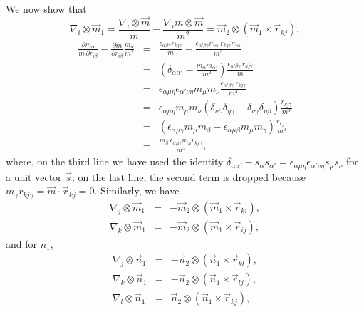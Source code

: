 \documentclass{article}
\begin{document}
We now show that
\begin{equation}
\nabla_i \otimes \vec m_1   
= \frac{ \nabla_i \otimes \vec m   } {m}
- \frac{ \nabla_i m \otimes \vec m } {m^2}   
= \vec m_2 \otimes (\vec m_1 \times \vec r_{kj}),
\label{eq:dim1}
\end{equation}
%
\begin{eqnarray*}
  \frac {\partial m_{\alpha}} {m \, \partial r_{i \beta} } 
  -
  \frac {\partial m} {\partial r_{i \beta}} 
  \frac {m_\alpha} {m^2} 
  &=&
  \frac{ \epsilon_{\alpha \beta \gamma} r_{kj \gamma} } { m }
  - \frac{ \epsilon_{\alpha' \beta \gamma} m_{\alpha'} r_{k j \gamma} m_\alpha }
    { m^3 } \\ 
  &=& 
  \left( 
       \delta_{\alpha \alpha'} 
       - \frac{ m_\alpha m_{\alpha'} }{ m^2 } 
  \right)  
  \frac{\epsilon_{\alpha' \beta \gamma} \, r_{kj \gamma} } {m} \\
  &=&
   \epsilon_{\alpha \mu \eta} \epsilon_{\alpha' \nu \eta}
   m_\mu m_\nu
  \frac{\epsilon_{\alpha' \beta \gamma} \, r_{kj \gamma} } {m^3} \\
  &=&
  \epsilon_{\alpha \mu \eta}   m_\mu m_\nu
  (\delta_{\nu \beta} \delta_{\eta \gamma} - 
   \delta_{\nu \gamma} \delta_{\eta \beta})
  \frac{ r_{kj \gamma} } {m^3} \\
  &=&
  (\epsilon_{\alpha \mu \gamma}   m_\mu m_\beta  - 
   \epsilon_{\alpha \mu \beta}   m_\mu m_\gamma )
  \frac{ r_{kj \gamma} } {m^3} \\
  &=&
  \frac{m_\beta \, \epsilon_{\alpha \mu \gamma}  m_\mu  r_{kj \gamma}} {m^3},
\end{eqnarray*}
%
where, on the third line we have used the identity 
$ \delta_{\alpha \alpha'} - s_\alpha s_{\alpha'} 
 = \epsilon_{\alpha \mu \eta} \epsilon_{\alpha' \nu \eta} s_\mu s_\nu $
for a unit vector $\vec s$; 
%
on the last line, the second term is dropped because 
$m_\gamma r_{kj \gamma}  = \vec m \cdot \vec r_{kj} = 0$.
%
Similarly, we have
\begin{eqnarray}
\nabla_j \otimes \vec m_1   &=&  -\vec m_2 \otimes (\vec m_1 \times \vec r_{ki}), \\
\nabla_k \otimes \vec m_1   &=&  -\vec m_2 \otimes (\vec m_1 \times \vec r_{ij}),
\end{eqnarray}
%
and for $n_1$,
\begin{eqnarray}
\nabla_j \otimes \vec n_1   &=&  -\vec n_2 \otimes (\vec n_1 \times \vec r_{kl}), \\
\nabla_k \otimes \vec n_1   &=&  -\vec n_2 \otimes (\vec n_1 \times \vec r_{lj}), \\
\nabla_l \otimes \vec n_1   &=&   \vec n_2 \otimes (\vec n_1 \times \vec r_{kj}),
\end{eqnarray}
\end{document}
